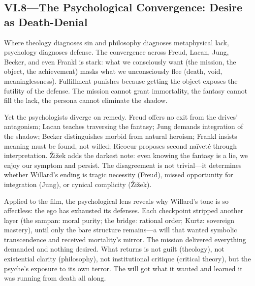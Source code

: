 \subsection*{VI.8—The Psychological Convergence: Desire as Death-Denial}
\label{ssec:vi-synthesis}

Where theology diagnoses sin and philosophy diagnoses metaphysical lack, psychology diagnoses 
defense. The convergence across Freud, Lacan, Jung, Becker, and even Frankl is stark: what we 
consciously want (the mission, the object, the achievement) masks what we unconsciously flee 
(death, void, meaninglessness). Fulfillment punishes because getting the object exposes the 
futility of the defense. The mission cannot grant immortality, the fantasy cannot fill the 
lack, the persona cannot eliminate the shadow.

Yet the psychologists diverge on remedy. Freud offers no exit from the drives' antagonism; 
Lacan teaches traversing the fantasy; Jung demands integration of the shadow; Becker 
distinguishes morbid from natural heroism; Frankl insists meaning must be found, not willed; 
Ricoeur proposes second naïveté through interpretation. {\v{Z}}i{\v{z}}ek adds the darkest 
note: even knowing the fantasy is a lie, we enjoy our symptom and persist. The disagreement is 
not trivial---it determines whether Willard's ending is tragic necessity (Freud), missed 
opportunity for integration (Jung), or cynical complicity ({\v{Z}}i{\v{z}}ek).

Applied to the film, the psychological lens reveals why Willard's tone is so affectless: the 
ego has exhausted its defenses. Each checkpoint stripped another layer (the sampan: moral 
purity; the bridge: rational order; Kurtz: sovereign mastery), until only the bare structure 
remains---a will that wanted symbolic transcendence and received mortality's mirror. The 
mission delivered everything demanded and nothing desired. What returns is not guilt 
(theology), not existential clarity (philosophy), not institutional critique (critical theory), 
but the psyche's exposure to its own terror. The will got what it wanted and learned it was 
running from death all along.

